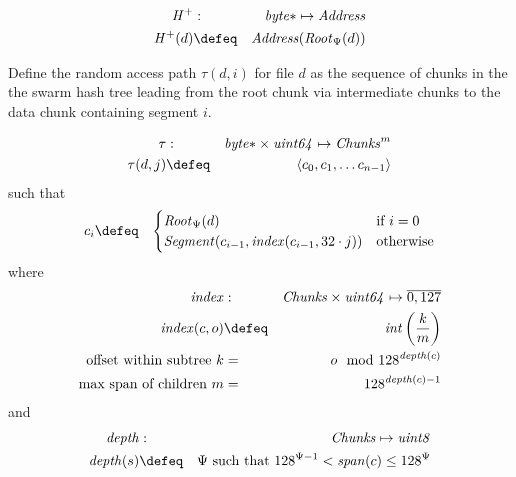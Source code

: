 \begin{definition}
\label{def:swarm-hash}
\begin{eqnarray}
\mathit{H}^{+}&:&\mathit{byte}{*}\mapsto\mathit{Address}\\
\mathit{H}^{+}(d)&\defeq&\mathit{Address}(\mathit{Root}_{\Psi}(d))
\end{eqnarray}
\end{definition}

\begin{definition}
\label{def:random-access-path}
Define the random access path $\tau(d,i)$ for file $d$ as the sequence of chunks in the the swarm hash tree leading from the root chunk via intermediate chunks to the data chunk containing segment $i$.

\begin{eqnarray}
\tau&:&\mathit{byte}{*}\times\mathit{uint64}\mapsto\mathit{Chunks}^m\\
\tau(d, j)&\defeq&\langle c_0, c_1, \ldots c_{n-1}\rangle
\end{eqnarray}
such that
\begin{eqnarray}
c_i&\defeq&
\begin{cases}
\mathit{Root}_\Psi(d)&\text{if }i=0\\
\mathit{Segment}(c_{i-1}, \mathit{index}(c_{i-1}, 32\cdot j))&\text{otherwise} 
\end{cases}
\end{eqnarray}
where
\begin{eqnarray}
\mathit{index}&:&\mathit{Chunks}\times\mathit{uint64}\mapsto\overline{0,127}\\
\mathit{index}(c, o)&\defeq&\mathit{int}\left(\frac{k}{m}\right)\\
\text{offset within subtree }k&=&o \mod 128^{\mathit{depth}(c)}\\
\text{max span of children } m&=&128^{\mathit{depth}(c)-1}
\end{eqnarray}
and
\begin{eqnarray}
\mathit{depth}&:&\mathit{Chunks}\mapsto \mathit{uint8}\\
\mathit{depth}(s)&\defeq&\Psi \text{ such that } 128^{\Psi-1}<\mathit{span}(c)\leq 128^\Psi
\end{eqnarray}
\end{definition}

